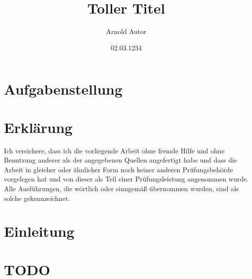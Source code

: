 \documentclass[draft]{max-masterarbeit} %
\title{Toller Titel}
\author{Arnold Autor}
\date{02.03.1234}
\begin{document}
\frontmatter
{} %

\titelseiteLRT
\pagestyle{empty}
\cleardoublepage
\chapter*{Aufgabenstellung}
\thispagestyle{empty}
\cleardoublepage
\chapter*{Erklärung}
\thispagestyle{empty}
Ich versichere, dass ich die vorliegende Arbeit ohne fremde Hilfe und ohne Benutzung anderer als
der angegebenen Quellen angefertigt habe und dass die Arbeit in gleicher oder ähnlicher Form noch
keiner anderen Prüfungsbehörde vorgelegen hat und von dieser als Teil einer Prüfungsleistung
angenommen wurde. Alle Ausführungen, die wörtlich oder sinngemäß übernommen wurden, sind als 
solche gekennzeichnet.

\vspace{4.5em}

\makeatletter
\let\thedate\@date
\let\theauthor\@author
\makeatother
\newcommand{\unterschriftsbreite}{.35\linewidth}
%

\cleardoublepage
{}
\pagestyle{scrheadings}
\tableofcontents



\mainmatter
\chapter{Einleitung}



\chapter{TODO}
\end{document}
